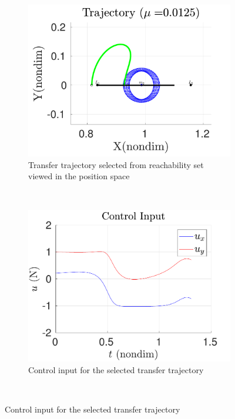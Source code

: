\begin{figure}
        \begin{subfigure}[htbp]{0.5\textwidth} 
            \includegraphics[width=\textwidth]{figures/2017_JAS/reach_transfer} 
                \caption{Transfer trajectory selected from reachability set viewed in the position space} \label{fig:reach_transfer} 
        \end{subfigure}~ 
        \begin{subfigure}[htbp]{0.5\textwidth} 
            \includegraphics[width=\textwidth]{figures/2017_JAS/control_input_l1} 
                \caption{Control input for the selected transfer trajectory} \label{fig:control_l1} 
        \end{subfigure}~


\end{figure}
